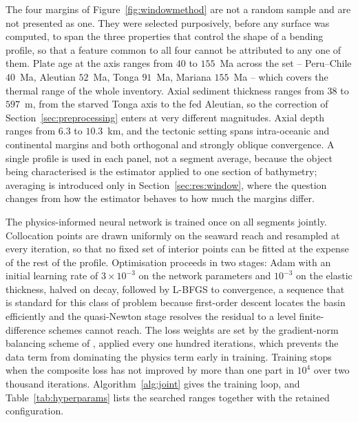 \documentclass[final]{agujournal2019}
\begin{document}
The four margins of Figure~\ref{fig:windowmethod} are not a random sample and
are not presented as one. They were selected purposively, before any surface was
computed, to span the three properties that control the shape of a bending
profile, so that a feature common to all four cannot be attributed to any one of
them. Plate age at the axis ranges from $40$ to $155$~Ma across the set --
Peru--Chile $40$~Ma, Aleutian $52$~Ma, Tonga $91$~Ma, Mariana $155$~Ma -- which
covers the thermal range of the whole inventory. Axial sediment thickness ranges
from $38$ to $597$~m, from the starved Tonga axis to the fed Aleutian, so the
correction of Section~\ref{sec:preprocessing} enters at very different
magnitudes. Axial depth ranges from $6.3$ to $10.3$~km, and the tectonic setting
spans intra-oceanic and continental margins and both orthogonal and strongly
oblique convergence. A single profile is used in each panel, not a segment
average, because the object being characterised is the estimator applied to one
section of bathymetry; averaging is introduced only in
Section~\ref{sec:res:window}, where the question changes from how the estimator
behaves to how much the margins differ.

The physics-informed neural network is trained once on all segments jointly.
Collocation points are drawn uniformly on the seaward reach and resampled at
every iteration, so that no fixed set of interior points can be fitted at the
expense of the rest of the profile. Optimisation proceeds in two stages: Adam
\cite{KingmaBa2015} with an initial learning rate of $3\times10^{-3}$ on the
network parameters and $10^{-3}$ on the elastic thickness, halved on decay,
followed by L-BFGS \cite{LiuNocedal1989} to convergence, a
sequence that is standard for this class of problem because first-order descent
locates the basin efficiently and the quasi-Newton stage resolves the residual
to a level finite-difference schemes cannot reach. The loss weights are set by
the gradient-norm balancing scheme of , applied every one
hundred iterations, which prevents the data term from dominating the physics
term early in training. Training stops when the composite loss has not improved
by more than one part in $10^{4}$ over two thousand iterations.
Algorithm~\ref{alg:joint} gives the training loop, and
Table~\ref{tab:hyperparams} lists the searched ranges together with the retained
configuration.
\end{document}

